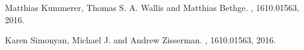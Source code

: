 \documentclass[portrait]{sciposter}
\begin{document}
\begin{multicols}{2}

\begin{thebibliography}{1}

Matthias Kummerer, Thomas S. A. Wallis and Matthias Bethge.
, 1610.01563, 2016.

Karen Simonyan, Michael J. and Andrew Zisserman.
, 1610.01563, 2016.



\end{thebibliography}


\end{multicols}
\end{document}

